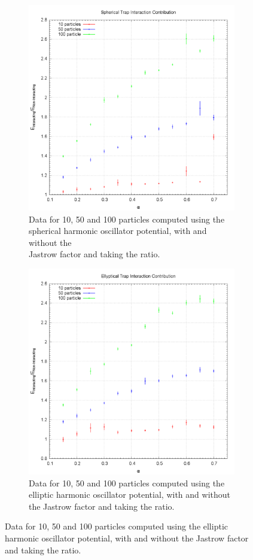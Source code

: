 \documentclass[10pt,a4paper,titlepage]{article}
\begin{document}
\begin{center}
\begin{figure}[H]
 \centering
\begin{subfigure}{.5\textwidth}
  \centering
  \includegraphics[width=.9\linewidth]{plot_jastrow_sphere.png}
  \caption{\footnotesize Data for 10, 50 and 100 particles computed using the \\spherical harmonic oscillator potential, with and without the \\Jastrow factor and taking the ratio.}
  \label{fig:sfisfdg2}
\end{subfigure}%
\begin{subfigure}{.5\textwidth}
  \centering
  \includegraphics[width=.9\linewidth]{plot_jastrow_ellipse.png}
  \caption{\footnotesize Data for 10, 50 and 100 particles computed using the elliptic harmonic oscillator potential, with and without the Jastrow factor and taking the ratio.}
  \label{fig:sfifdsg2}
\end{subfigure}%
\end{figure}
\end{center}
\end{document}
